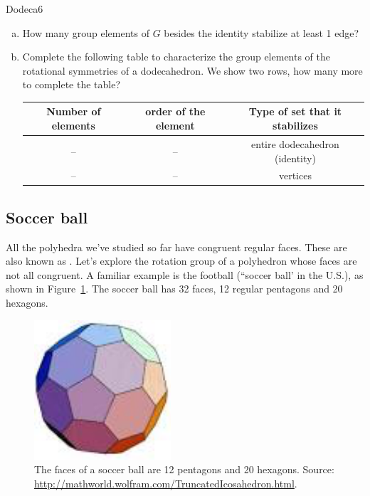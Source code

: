 \begin{exercise}{Dodeca6} 
\begin{enumerate}[(a)]
\item How many group elements of $G$ besides the identity stabilize at least 1 edge?
\item
Complete the following table to characterize the group elements of the rotational symmetries of a dodecahedron.  We show two rows, how many more to complete the table?  

\begin{tabular}{ |c |  c | c |}\hline
  Number of elements & order of the element & Type of set that it stabilizes \\ \hline
  --&  --& entire  dodecahedron (identity) \\ \hline
  -- & --&  vertices \\ 
\end{tabular}
\end{enumerate}
\end{exercise}

\subsection{Soccer ball}
All the polyhedra we've studied so far have congruent regular faces.  These are also known as .  Let's explore the rotation group of a polyhedron whose faces are not all congruent.  A familiar example is the football (``soccer ball' in the U.S.), as shown in  Figure~\ref{fig:Soccer}.  The soccer ball has 32 faces, 12 regular pentagons and 20 hexagons.  

\begin{figure}[ht]
\begin{center}
\includegraphics[width=2in]{images/Soccerball.png}
\caption{The faces of a soccer ball are 12 pentagons and 20 hexagons.  Source: \url{http://mathworld.wolfram.com/TruncatedIcosahedron.html}.
}
\label{fig:Soccer}
\end{center}
\end{figure}


